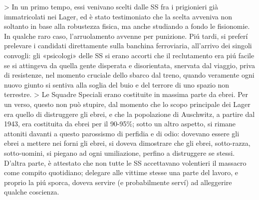 > In un primo tempo, essi venivano scelti dalle SS fra i prigionieri già immatricolati nei Lager, ed è stato testimoniato che la scelta avveniva non soltanto in base alla robustezza fisica, ma anche studiando a fondo le fisionomie. In qualche raro caso, l’arruolamento avvenne per punizione. Piú tardi, si preferí prelevare i candidati direttamente sulla banchina ferroviaria, all’arrivo dei singoli convogli: gli «psicologi» delle SS si erano accorti che il reclutamento era piú facile se si attingeva da quella gente disperata e disorientata, snervata dal viaggio, priva di resistenze, nel momento cruciale dello sbarco dal treno, quando veramente ogni nuovo giunto si sentiva alla soglia del buio e del terrore di uno spazio non terrestre.
> Le Squadre Speciali erano costituite in massima parte da ebrei. Per un verso, questo non può stupire, dal momento che lo scopo principale dei Lager era quello di distruggere gli ebrei, e che la popolazione di Auschwitz, a partire dal 1943, era costituita da ebrei per il 90-95\%; sotto un altro aspetto, si rimane attoniti davanti a questo parossismo di perfidia e di odio: dovevano essere gli ebrei a mettere nei forni gli ebrei, si doveva dimostrare che gli ebrei, sotto-razza, sotto-uomini, si piegano ad ogni umiliazione, perfino a distruggere se stessi. D’altra parte, è attestato che non tutte le SS accettavano volentieri il massacro come compito quotidiano; delegare alle vittime stesse una parte del lavoro, e proprio la piú sporca, doveva servire (e probabilmente serví) ad alleggerire qualche coscienza.